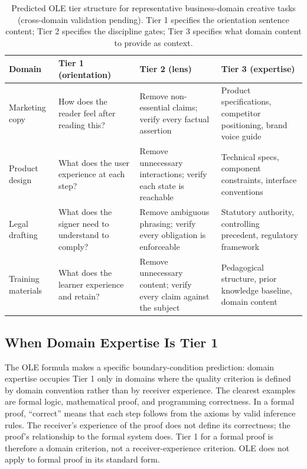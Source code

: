 \begin{table}[t]
\centering
\caption{Predicted OLE tier structure for representative business-domain creative tasks
(cross-domain validation pending). Tier 1 specifies the orientation sentence content;
Tier 2 specifies the discipline gates; Tier 3 specifies what domain content to provide
as context.}
\label{tab:generalization}
\begin{tabular}{p{2.0cm}p{3.2cm}p{3.2cm}p{3.2cm}}
\toprule
\textbf{Domain} & \textbf{Tier 1 (orientation)} & \textbf{Tier 2 (lens)} & \textbf{Tier 3 (expertise)} \\
\midrule
Marketing copy & How does the reader feel after reading this? & Remove non-essential claims; verify every factual assertion & Product specifications, competitor positioning, brand voice guide \\
\addlinespace
Product design & What does the user experience at each step? & Remove unnecessary interactions; verify each state is reachable & Technical specs, component constraints, interface conventions \\
\addlinespace
Legal drafting & What does the signer need to understand to comply? & Remove ambiguous phrasing; verify every obligation is enforceable & Statutory authority, controlling precedent, regulatory framework \\
\addlinespace
Training materials & What does the learner experience and retain? & Remove unnecessary content; verify every claim against the subject & Pedagogical structure, prior knowledge baseline, domain content \\
\bottomrule
\end{tabular}
\end{table}

\subsection{When Domain Expertise Is Tier 1}

The OLE formula makes a specific boundary-condition prediction: domain expertise occupies
Tier 1 only in domains where the quality criterion is defined by domain convention rather
than by receiver experience. The clearest examples are formal logic, mathematical proof,
and programming correctness. In a formal proof, ``correct'' means that each step follows
from the axioms by valid inference rules. The receiver's experience of the proof does not
define its correctness; the proof's relationship to the formal system does. Tier 1 for a
formal proof is therefore a domain criterion, not a receiver-experience criterion. OLE
does not apply to formal proof in its standard form.


